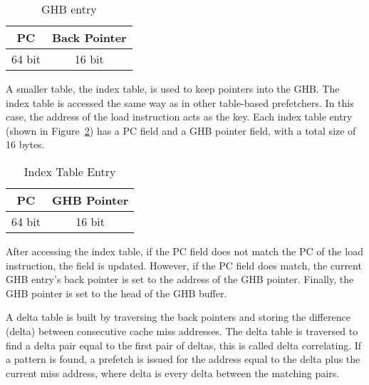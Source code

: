 \begin{table}[h!]
  \centering
  \begin{tabular}{| c | c |}
    \hline
    PC & Back Pointer \\ \hline
    64 bit & 16 bit \\ \hline
  \end{tabular}
  \caption{GHB entry}
  \label{table:ghb_ent}
\end{table}

A smaller table, the index table, is used to keep pointers into the
GHB. The index table is accessed the same way as in other table-based
prefetchers. In this case, the address of the load instruction acts as
the key. Each index table entry (shown in Figure~\ref{table:idx_ent})
has a PC field and a GHB pointer field, with a total size of 16 bytes.

\begin{table}[h!]
  \centering
  \begin{tabular}{| c | c |}
    \hline
    PC & GHB Pointer \\ \hline
    64 bit & 16 bit \\ \hline
  \end{tabular}
  \caption{Index Table Entry}
  \label{table:idx_ent}
\end{table}

After accessing the index table, if the PC field does not match the PC
of the load instruction, the field is updated. However, if the PC
field does match, the current GHB entry's back pointer is set to the
address of the GHB pointer. Finally, the GHB pointer is set to the
head of the GHB buffer.

A delta table is built by traversing the back pointers and storing the
difference (delta) between consecutive cache miss addresses. The delta
table is traversed to find a delta pair equal to the first pair of
deltas, this is called delta correlating. If a pattern is found, a
prefetch is issued for the address equal to the delta plus the current
miss address, where delta is every delta between the matching pairs.
